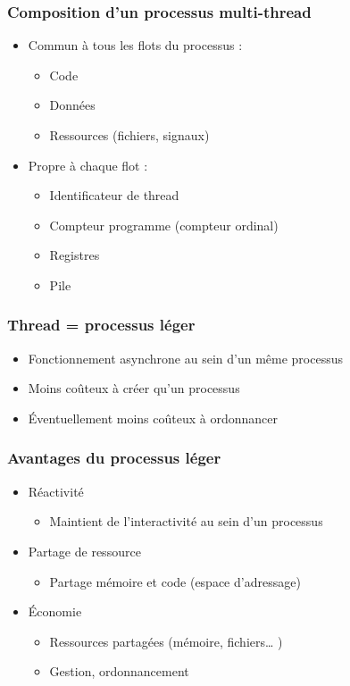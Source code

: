 \begin{frame}
 \frametitle{Composition d’un processus multi-thread}
 \begin{itemize}
 \item Commun à tous les flots du processus :
 \begin{itemize}
 \item Code
 \item Données
 \item Ressources (fichiers, signaux)
 \end{itemize}
 \item Propre à chaque flot :
 \begin{itemize}
 \item Identificateur de thread
 \item Compteur programme (compteur ordinal)
 \item Registres
 \item Pile
 \end{itemize}
 \end{itemize}
\end{frame}


\begin{frame}
 \frametitle{Thread = processus léger}
 \begin{itemize}
 \item Fonctionnement asynchrone au sein d’un même processus
 \item Moins coûteux à créer qu’un processus
 \item Éventuellement moins coûteux à ordonnancer
 \end{itemize}
\end{frame}


\begin{frame}
 \frametitle{Avantages du processus léger}
 \begin{itemize}
 \item Réactivité
 \begin{itemize}
 \item Maintient de l’interactivité au sein d’un processus
 \end{itemize}
 \item Partage de ressource
 \begin{itemize}
 \item Partage mémoire et code (espace d’adressage)
 \end{itemize}
 \item Économie
 \begin{itemize}
 \item Ressources partagées (mémoire, fichiers… )
 \item Gestion, ordonnancement
 \end{itemize}
 \end{itemize}
\end{frame}


